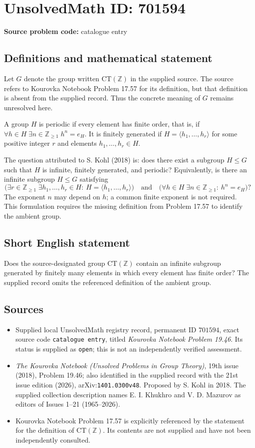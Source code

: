 \documentclass[11pt]{article}
\begin{document}
\section*{UnsolvedMath ID: 701594}
\textbf{Source problem code:} catalogue entry
\subsection{Definitions and mathematical statement}
Let \(G\) denote the group written \(\mathrm{CT}(\mathbb{Z})\) in the supplied source. The source refers to Kourovka Notebook Problem 17.57 for its definition, but that definition is absent from the supplied record. Thus the concrete meaning of \(G\) remains unresolved here.

A group \(H\) is periodic if every element has finite order, that is, if \(\forall h\in H\;\exists n\in\mathbb{Z}_{\geq 1}\; h^n=e_H\). It is finitely generated if \(H=\langle h_1,\ldots,h_r\rangle\) for some positive integer \(r\) and elements \(h_1,\ldots,h_r\in H\).

The question attributed to S. Kohl (2018) is: does there exist a subgroup \(H\leq G\) such that \(H\) is infinite, finitely generated, and periodic? Equivalently, is there an infinite subgroup \(H\leq G\) satisfying
\[
\bigl(\exists r\in\mathbb{Z}_{\geq 1}\;\exists h_1,\ldots,h_r\in H:\ H=\langle h_1,\ldots,h_r\rangle\bigr)
\quad\text{and}\quad
\bigl(\forall h\in H\;\exists n\in\mathbb{Z}_{\geq 1}:\ h^n=e_H\bigr)?
\]
The exponent \(n\) may depend on \(h\); a common finite exponent is not required. This formulation requires the missing definition from Problem 17.57 to identify the ambient group.
\subsection{Short English statement}
Does the source-designated group \(\mathrm{CT}(\mathbb{Z})\) contain an infinite subgroup generated by finitely many elements in which every element has finite order? The supplied record omits the referenced definition of the ambient group.
\subsection{Sources}
\begin{itemize}
\item Supplied local UnsolvedMath registry record, permanent ID \(701594\), exact source code \texttt{catalogue entry}, titled \emph{Kourovka Notebook Problem 19.46}. Its status is supplied as \texttt{open}; this is not an independently verified assessment.
\item \emph{The Kourovka Notebook (Unsolved Problems in Group Theory)}, 19th issue (2018), Problem 19.46; also identified in the supplied record with the 21st issue edition (2026), arXiv:\texttt{1401.0300v48}. Proposed by S. Kohl in 2018. The supplied collection description names E. I. Khukhro and V. D. Mazurov as editors of Issues 1--21 (1965--2026).
\item Kourovka Notebook Problem 17.57 is explicitly referenced by the statement for the definition of \(\mathrm{CT}(\mathbb{Z})\). Its contents are not supplied and have not been independently consulted.
\end{itemize}
\end{document}
